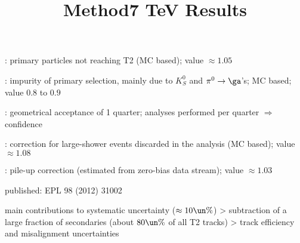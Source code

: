 \newpage %
\title{Method}



\> : primary particles not reaching T2 (MC based); value $\approx 1.05$

\> : impurity of primary selection, mainly due to $K_S^0$ and $\pi^0\rightarrow \ga$'s; MC based; value $0.8$ to $0.9$

\> \Em{$2\pi/\Ph$}: geometrical acceptance of 1 quarter; analyses performed per quarter $\Rightarrow$ confidence

\> : correction for large-shower events discarded in the analysis (MC based); value $\approx 1.08$

\> : pile-up correction (estimated from zero-bias data stream); value $\approx 1.03$

\newpage %
\title{7 TeV Results}

\> published: EPL 98 (2012) 31002

\> main contributions to systematic uncertainty ($\approx 10\un{\%}$)
\>> subtraction of a large fraction of secondaries (about $80\un{\%}$ of all T2 tracks)
\>> track efficiency and misalignment uncertainties


